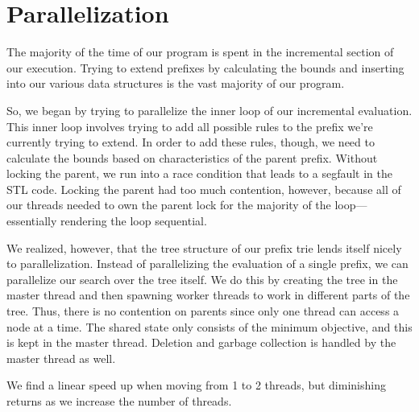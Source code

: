 \section{Parallelization}

The majority of the time of our program is spent in the incremental section of our execution.
Trying to extend prefixes by calculating the bounds and inserting into our various data structures is the vast majority of our program.

So, we began by trying to parallelize the inner loop of our incremental evaluation.
This inner loop involves trying to add all possible rules to the prefix we're currently trying to extend.
In order to add these rules, though, we need to calculate the bounds based on characteristics of the parent prefix.
Without locking the parent, we run into a race condition that leads to a segfault in the STL code.
Locking the parent had too much contention, however, because all of our threads needed to own the parent lock for the majority of the loop---essentially rendering the loop sequential.

We realized, however, that the tree structure of our prefix trie lends itself nicely to parallelization.
Instead of parallelizing the evaluation of a single prefix, we can parallelize our search over the tree itself.
We do this by creating the tree in the master thread and then spawning worker threads to work in different parts of the tree.
Thus, there is no contention on parents since only one thread can access a node at a time.
The shared state only consists of the minimum objective, and this is kept in the master thread.
Deletion and garbage collection is handled by the master thread as well.

We find a linear speed up when moving from 1 to 2 threads, but diminishing returns as we increase the number of threads.